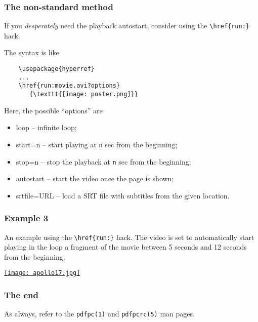 \documentclass{beamer}
\newcommand{\opt}[1]{\texttt{#1}\xspace}
\begin{document}
\begin{frame}[fragile]
  \frametitle{The non-standard method}

  If you {\em desperately} need the playback autostart, consider
  using the \opt{\textbackslash href\{run:\}} hack.

  The syntax is like

  \begin{lstlisting}
    \usepackage{hyperref}
    ...
    \href{run:movie.avi?options}
       {\texttt{[image: poster.png]}}
  \end{lstlisting}

  Here, the possible ``options'' are
  \begin{itemize}
    \item loop -- infinite loop;
    \item start=n -- start playing at \opt{n} sec from the beginning;
    \item stop=n -- stop the playback at \opt{n} sec from the beginning;
    \item autostart -- start the video once the page is shown;
    \item srtfile=URL -- load a SRT file with subtitles from the given
      location.
  \end{itemize}

\end{frame}

\begin{frame}
  \frametitle{Example 3}

  An example using the \opt{\textbackslash href\{run:\}} hack. The
  video is set to automatically start playing in the loop a fragment of the
  movie between 5 seconds and 12 seconds from the beginning.

  \vspace{5pt}

  \begin{center}
    \href{run:apollo17.avi?autostart&loop&start=5&stop=12}
       {\texttt{[image: apollo17.jpg]}}
  \end{center}
\end{frame}

\begin{frame}
  \frametitle{The end}
  
  As always, refer to the \opt{pdfpc(1)} and \opt{pdfpcrc(5)} man pages.

\end{frame}
\end{document}
